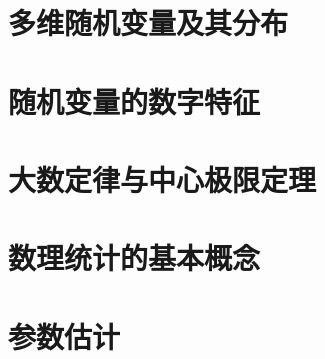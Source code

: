 \documentclass[lang=cn,math=mtpro2,11pt,scheme=chinese]{elegantbook}
\begin{document}
\section{多维随机变量及其分布}

\vspace{2em}

\section{随机变量的数字特征}

\vspace{2em}

\section{大数定律与中心极限定理}

\vspace{0em}

\section{数理统计的基本概念}

\vspace{2em}

\section{参数估计}



\end{document}
